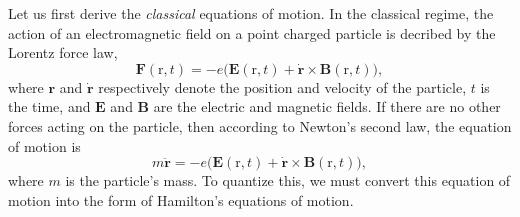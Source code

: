 \documentclass[pra,12pt]{revtex4}
\begin{document}
Let us first derive the \textit{classical} equations of motion.  In
the classical regime, the action of an electromagnetic field on a
point charged particle is decribed by the Lorentz force law,
\begin{equation}
  \mathbf{F}(\mathrm{r},t) = -e\Big(\mathbf{E}(\mathrm{r},t)
  + \dot{\mathbf{r}}\times \mathbf{B}(\mathrm{r},t)\Big),
\end{equation}
where $\mathbf{r}$ and $\dot{\mathbf{r}}$ respectively denote the
position and velocity of the particle, $t$ is the time, and
$\mathbf{E}$ and $\mathbf{B}$ are the electric and magnetic fields.
If there are no other forces acting on the particle, then according to
Newton's second law, the equation of motion is
\begin{equation}
  m\ddot{\mathbf{r}} = -e\Big(\mathbf{E}(\mathrm{r},t)
  + \dot{\mathbf{r}} \times \mathbf{B}(\mathrm{r},t)\Big),
  \label{eom}
\end{equation}
where $m$ is the particle's mass.  To quantize this, we must convert
this equation of motion into the form of Hamilton's equations of
motion.
\end{document}
